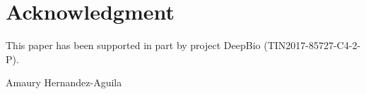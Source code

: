 \documentclass{ieeeaccess}
\begin{document}








\section*{Acknowledgment}
This paper has been supported in part by project DeepBio (TIN2017-85727-C4-2-P).

\begin{IEEEbiography}{Amaury
  Hernandez-Aguila} 
\end{IEEEbiography}




\EOD
\end{document}
